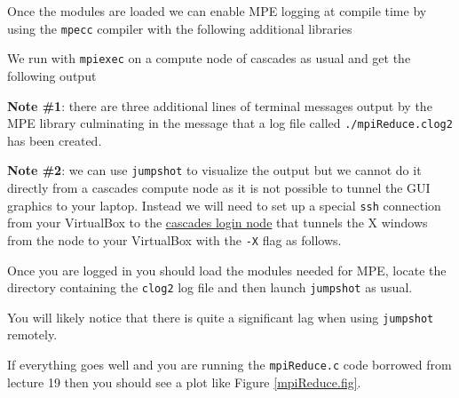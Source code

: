 
Once the modules are loaded we can enable MPE logging at compile time by using the \texttt{mpecc} compiler with the following additional libraries


We run with \texttt{mpiexec} on a compute node of cascades as usual and get the following output


{\bf Note \#1}: there are three additional lines of terminal messages output by the MPE library culminating in the message that a log file called \texttt{./mpiReduce.clog2} has been created.

{\bf Note \#2}: we can use \texttt{jumpshot} to visualize the output but we cannot do it directly from a cascades compute node as it is not possible to tunnel the GUI graphics to your laptop. Instead we will need to set up a special \texttt{ssh} connection from your VirtualBox to the \underline{cascades login node} that tunnels the X windows from the node to your VirtualBox with the \texttt{-X} flag as follows.


Once you are logged in you should load the modules needed for MPE, locate the directory containing the \texttt{clog2} log file and then launch \texttt{jumpshot} as usual. 


You will likely notice that there is quite a significant lag when using \texttt{jumpshot} remotely.

If everything goes well and you are running the \texttt{mpiReduce.c} code borrowed from lecture 19 then you should see a plot like Figure \ref{mpiReduce.fig}.

